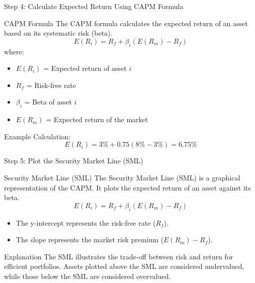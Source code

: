 \documentclass{beamer}
\begin{document}
\begin{frame}{Step 4: Calculate Expected Return Using CAPM Formula}
  \begin{block}{CAPM Formula}
    The CAPM formula calculates the expected return of an asset based on its systematic risk (beta).
    \begin{equation*}
      E(R_i) = R_f + \beta_i (E(R_m) - R_f)
    \end{equation*}
    where:
    \begin{itemize}
      \item \( E(R_i) \) = Expected return of asset \( i \)
      \item \( R_f \) = Risk-free rate
      \item \( \beta_i \) = Beta of asset \( i \)
      \item \( E(R_m) \) = Expected return of the market
    \end{itemize}
    Example Calculation:
    \begin{equation*}
      E(R_i) = 3\% + 0.75 (8\% - 3\%) = 6.75\%
    \end{equation*}
  \end{block}
\end{frame}

\begin{frame}{Step 5: Plot the Security Market Line (SML)}
  \begin{block}{Security Market Line (SML)}
    The Security Market Line (SML) is a graphical representation of the CAPM. It plots the expected return of an asset against its beta.
    \begin{equation*}
      E(R_i) = R_f + \beta_i (E(R_m) - R_f)
    \end{equation*}
    \begin{itemize}
      \item The y-intercept represents the risk-free rate (\(R_f\)).
      \item The slope represents the market risk premium (\(E(R_m) - R_f\)).
    \end{itemize}
  \end{block}
  \begin{block}{Explanation}
    The SML illustrates the trade-off between risk and return for efficient portfolios. Assets plotted above the SML are considered undervalued, while those below the SML are considered overvalued.
  \end{block}
\end{frame}
\end{document}

